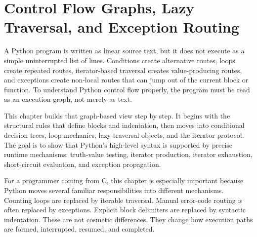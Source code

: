 \chapter{Control Flow Graphs, Lazy Traversal, and Exception Routing}

A Python program is written as linear source text, but it does not execute as a simple uninterrupted list of lines. Conditions create alternative routes, loops create repeated routes, iterator-based traversal creates value-producing routes, and exceptions create non-local routes that can jump out of the current block or function. To understand Python control flow properly, the program must be read as an execution graph, not merely as text.

This chapter builds that graph-based view step by step. It begins with the structural rules that define blocks and indentation, then moves into conditional decision trees, loop mechanics, lazy traversal objects, and the iterator protocol. The goal is to show that Python's high-level syntax is supported by precise runtime mechanisms: truth-value testing, iterator production, iterator exhaustion, short-circuit evaluation, and exception propagation.

For a programmer coming from C, this chapter is especially important because Python moves several familiar responsibilities into different mechanisms. Counting loops are replaced by iterable traversal. Manual error-code routing is often replaced by exceptions. Explicit block delimiters are replaced by syntactic indentation. These are not cosmetic differences. They change how execution paths are formed, interrupted, resumed, and completed.